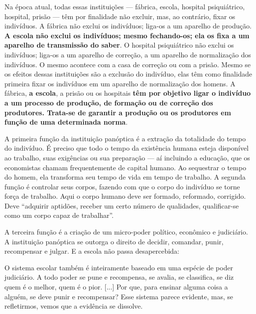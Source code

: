 \documentclass[
  12pt,
  letterpaper,
  DIV=11,
  numbers=noendperiod]{scrartcl}
\newenvironment{citacao}
    {\begin{quoting}[rightmargin=0cm,leftmargin=4cm]
    \begin{singlespace}
    \footnotesize
    }
    {\end{singlespace}
    \end{quoting}
}
\begin{document}
\begin{citacao}
Na época atual, todas essas instituições --- fábrica, escola, hospital psiquiátrico, hospital, prisão --- têm por finalidade não excluir, mas, ao contrário, fixar os indivíduos. A fábrica não exclui os indivíduos; liga-os a um aparelho de produção. \textbf{A escola não exclui os indivíduos; mesmo fechando-os; ela os fixa a um aparelho de transmissão do saber}. O hospital psiquiátrico não exclui os indivíduos; liga-os a um aparelho de correção, a um aparelho de normalização dos indivíduos. O mesmo acontece com a casa de correção ou com a prisão. Mesmo se os efeitos dessas instituições são a exclusão
do indivíduo, elas têm como finalidade primeira fixar os indivíduos em um aparelho de normalização dos homens. A fábrica, \textbf{a escola}, a prisão ou os hospitais \textbf{têm por objetivo ligar o indivíduo a um processo de produção, de formação ou de correção dos produtores. Trata-se de garantir a produção ou os produtores em função de uma determinada norma}. \citep[p.~114]{foucault}
\end{citacao}

A primeira função da instituição panóptica é a extração da totalidade do
tempo do indivíduo. É preciso que todo o tempo da existência humana
esteja disponível ao trabalho, suas exigências ou sua preparação --- aí
incluindo a educação, que os economistas chamam frequentemente de
capital humano. Ao sequestrar o tempo do homem, ela transforma seu tempo
de vida em tempo de trabalho. A segunda função é controlar seus corpos,
fazendo com que o corpo do indivíduo se torne força de trabalho. Aqui o
corpo humano deve ser formado, reformado, corrigido. Deve ``adquirir
aptidões, receber um certo número de qualidades, qualificar-se como um
corpo capaz de trabalhar''.

A terceira função é a criação de um micro-poder político, econômico e
judiciário. A instituição panóptica se outorga o direito de decidir,
comandar, punir, recompensar e julgar. E a escola não passa
desapercebida:

\begin{citacao}
O sistema escolar também é inteiramente baseado em uma espécie de poder judiciário. A todo poder se pune e recompensa, se avalia, se classifica, se diz quem é o melhor, quem é o pior. [...] Por que, para ensinar alguma coisa a alguém, se deve punir e recompensar? Esse sistema parece evidente, mas, se refletirmos, vemos que a evidência se dissolve. \citep[p.~120]{foucault}
\end{citacao}
\end{document}
